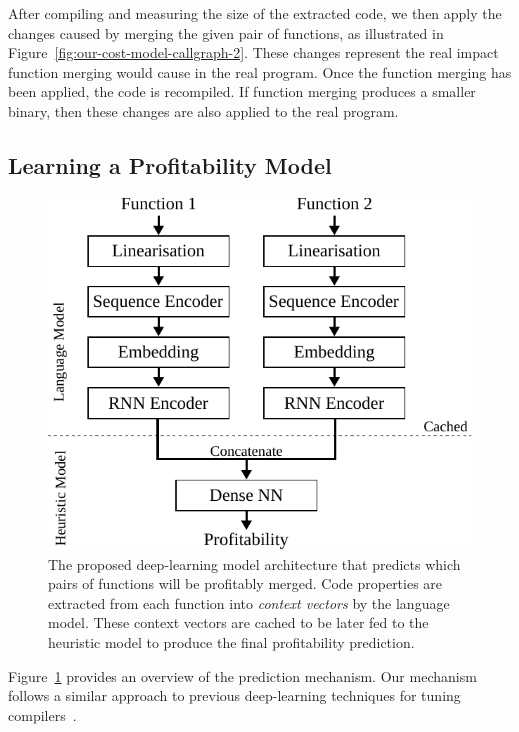 After compiling and measuring the size of the extracted code, we then apply the changes caused by merging the given pair of functions, as illustrated in Figure~\ref{fig:our-cost-model-callgraph-2}.
These changes represent the real impact function merging would cause in the real program.
Once the function merging has been applied, the code is recompiled.
If function merging produces a smaller binary, then these changes are also applied to the real program.

\subsection{Learning a Profitability Model}

\begin{figure}[h]
  \centering
  \includegraphics[scale=0.85]{src/deeplearning/figs/deeplearning-architecture.pdf}
  \caption{
      The proposed deep-learning model architecture that predicts which pairs of functions will be profitably merged. Code properties are extracted from each function into \textit{context vectors} by the language model.
      These context vectors are cached to be later fed to the heuristic model to produce the final profitability prediction.}
  \label{fig:heuristic-model-architecture}
\end{figure}

Figure~\ref{fig:heuristic-model-architecture} provides an overview of the prediction mechanism.
Our mechanism follows a similar approach to previous deep-learning techniques for tuning compilers~\cite{cummins17, mendis19}.


